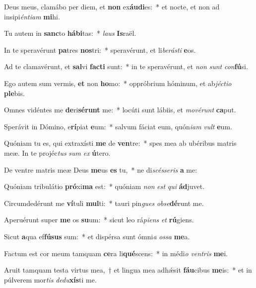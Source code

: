 \item Deus meus, clamábo per diem, et \textbf{non} ex\textbf{áu}\textbf{di}es:~* et nocte, et non ad insipi\textit{én}\textit{ti}\textit{am} \textbf{mi}hi.
\item Tu autem in \textbf{sanc}to \textbf{há}\textbf{bi}tas:~* \textit{laus} \textbf{Is}raël.
\item In te speravérunt \textbf{pa}tres \textbf{nos}tri:~* speravérunt, et li\textit{be}\textit{rás}\textit{ti} \textbf{e}os.
\item Ad te clamavérunt, et \textbf{sal}vi \textbf{fac}\textbf{ti} sunt:~* in te speravérunt, et \textit{non} \textit{sunt} \textit{con}\textbf{fú}si.
\item Ego autem sum vermis, \textbf{et} non \textbf{ho}mo:~* oppróbrium hóminum, et ab\textit{jéc}\textit{ti}\textit{o} \textbf{ple}bis.
\item Omnes vidéntes me \textbf{de}ri\textbf{sé}\textbf{runt} me:~* locúti sunt lábiis, et \textit{mo}\textit{vé}\textit{runt} \textbf{ca}put.
\item Sperávit in Dómino, e\textbf{rí}piat \textbf{e}um:~* salvum fáciat eum, quón\textit{i}\textit{am} \textit{vult} \textbf{e}um.
\item Quóniam tu es, qui extraxísti \textbf{me} de \textbf{ven}tre:~* spes mea ab ubéribus matris meæ. In te projéc\textit{tus} \textit{sum} \textit{ex} \textbf{ú}tero.
\item De ventre matris meæ Deus \textbf{me}us \textbf{es} tu,~* ne di\textit{scés}\textit{se}\textit{ris} \textbf{a} me:
\item Quóniam tribulátio \textbf{pró}xi\textbf{ma} est:~* quóniam \textit{non} \textit{est} \textit{qui} \textbf{ád}juvet.
\item Circumdedérunt me \textbf{ví}tuli \textbf{mul}ti:~* tauri pin\textit{gues} \textit{ob}\textit{se}\textbf{dé}runt me.
\item Aperuérunt super \textbf{me} os \textbf{su}um:~* sicut leo rá\textit{pi}\textit{ens} \textit{et} \textbf{rú}giens.
\item Sicut \textbf{a}qua ef\textbf{fú}\textbf{sus} sum:~* et dispérsa sunt ómni\textit{a} \textit{os}\textit{sa} \textbf{me}a.
\item Factum est cor meum tamquam \textbf{ce}ra li\textbf{qué}scens:~* in médi\textit{o} \textit{ven}\textit{tris} \textbf{me}i.
\item Aruit tamquam testa virtus mea,~† et lingua mea adhǽsit \textbf{fáu}cibus \textbf{me}is:~* et in púlverem mor\textit{tis} \textit{de}\textit{du}\textbf{xís}ti me.
